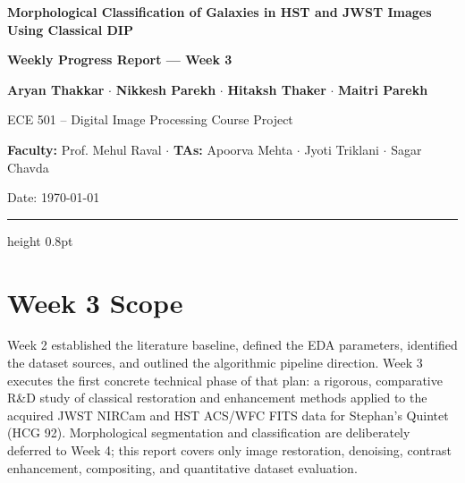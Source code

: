 \documentclass[11pt]{article}
\begin{document}
\thispagestyle{fancy}


\begin{center}

\Large\textbf{Morphological Classification of Galaxies in HST and JWST Images Using Classical DIP}

\vspace{3pt}

\normalsize\textbf{Weekly Progress Report --- Week 3}

\vspace{4pt}

\small
\textbf{Aryan Thakkar}
\quad $\cdot$ \quad
\textbf{Nikkesh Parekh}
\quad $\cdot$ \quad
\textbf{Hitaksh Thaker}
\quad $\cdot$ \quad
\textbf{Maitri Parekh}

\vspace{3pt}

\small ECE 501 -- Digital Image Processing Course Project

\vspace{2pt}

\small\textbf{Faculty:} Prof. Mehul Raval
\quad $\cdot$ \quad
\textbf{TAs:} Apoorva Mehta \quad $\cdot$ \quad Jyoti Triklani \quad $\cdot$ \quad Sagar Chavda

\vspace{3pt}

\small Date: \today

\end{center}

\vspace{1pt}
\hrule height 0.8pt
\vspace{3pt}


\section{Week 3 Scope}
Week 2 established the literature baseline, defined the EDA parameters, identified the dataset sources, and outlined the algorithmic pipeline direction. Week 3 executes the first concrete technical phase of that plan: a rigorous, comparative R\&D study of classical restoration and enhancement methods applied to the acquired JWST NIRCam and HST ACS/WFC FITS data for Stephan's Quintet (HCG 92). Morphological segmentation and classification are deliberately deferred to Week 4; this report covers only image restoration, denoising, contrast enhancement, compositing, and quantitative dataset evaluation.
\end{document}
